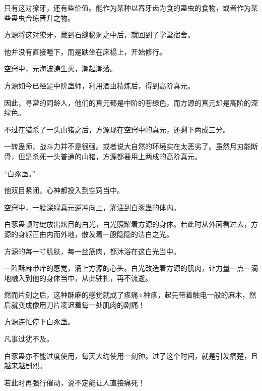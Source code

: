 \begin{this_body}
只有这对獠牙，还有些价值。能作为某种以吞牙齿为食的蛊虫的食物，或者作为某些蛊虫合练晋升之物。

方源将这对獠牙，藏到石缝秘洞之中后，就回到了学堂宿舍。

他并没有直接睡下，而是趺坐在床榻上，开始修行。

空窍中，元海波涛生灭，潮起潮落。

方源如今已经是中阶蛊师，利用酒虫精炼后，得到高阶真元。

因此，寻常的同龄人，他们的真元都是中阶的苍绿色，而方源的真元却是高阶的深绿色。

不过在猎杀了一头山猪之后，方源现在空窍中的真元，还剩下两成三分。

一转蛊师，战斗力并不是很强。或者说大自然的环境实在太恶劣了。虽然月刃能断骨，但是杀死一头普通的山猪，方源都要用上两成的高阶真元。

“白豕蛊。”

他双目紧闭，心神都投入到空窍当中。

空窍中，一股深绿真元逆冲向上，灌注到白豕蛊的体内。

白豕蛊顿时绽放出炫目的白光，白光照耀着方源的身体。若此时从外面看过去，方源的身躯正由内而外地，散发着一股隐隐的洁白之光。

方源的每一寸肌肤，每一丝筋肉，都沐浴在这白光当中。

一阵酥麻带痒的感觉，涌上方源的心头。白光改造着方源的肌肉，让力量一点一滴地融入到他的身体当中，从此驻扎，再不流逝。

然而片刻之后，这种酥麻的感觉就成了疼痛♀种疼，起先带着触电一般的麻木，然后就变成像用刀片凌迟着每一处肌肉的剧痛！

方源连忙停下白豕蛊。

凡事过犹不及。

白豕蛊亦不能过度使用，每天大约使用一刻钟。过了这个时间，就是引发痛楚，且越来越剧烈。

若此时再强行催动，说不定能让人直接痛死！

\end{this_body}

